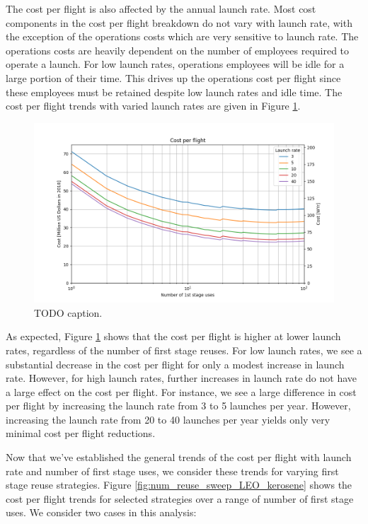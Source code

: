 \documentclass[conf]{new-aiaa}
\begin{document}
The cost per flight is also affected by the annual launch rate. Most cost components in the cost per flight breakdown do not vary with launch rate, with the exception of the operations costs which are very sensitive to launch rate. The operations costs are heavily dependent on the number of employees required to operate a launch. For low launch rates, operations employees will be idle for a large portion of their time. This drives up the operations cost per flight since these employees must be retained despite low launch rates and idle time. The cost per flight trends with varied launch rates are given in Figure \ref{fig:cpf_reuses_sweep_vary_launch_rate}. 

\begin{figure}[hbt!]
    \centering
    \includegraphics[width=\textwidth]{../../lvreuse/analysis/combined/plots/cpf_reuses_sweep_vary_launch_rate}
    \caption{\label{fig:cpf_reuses_sweep_vary_launch_rate} TODO caption.}
\end{figure}

As expected, Figure \ref{fig:cpf_reuses_sweep_vary_launch_rate} shows that the cost per flight is higher at lower launch rates, regardless of the number of first stage reuses. For low launch rates, we see a substantial decrease in the cost per flight for only a modest increase in launch rate. However, for high launch rates, further increases in launch rate do not have a large effect on the cost per flight. For instance, we see a large difference in cost per flight by increasing the launch rate from 3 to 5 launches per year. However, increasing the launch rate from 20 to 40 launches per year yields only very minimal cost per flight reductions. 

Now that we've established the general trends of the cost per flight with launch rate and number of first stage uses, we consider these trends for varying first stage reuse strategies. Figure \ref{fig:num_reuse_sweep_LEO_kerosene} shows the cost per flight trends for selected strategies over a range of number of first stage uses. We consider two cases in this analysis: 
\end{document}
